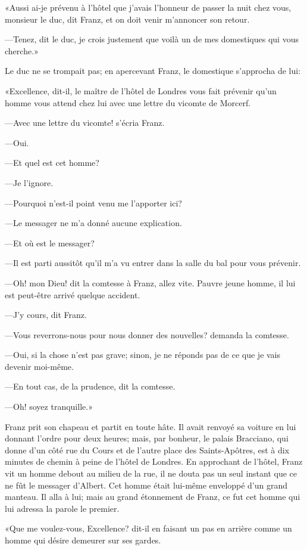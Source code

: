 «Aussi ai-je prévenu à l'hôtel que j'avais l'honneur de passer la nuit chez vous, monsieur le duc, dit Franz, et on doit venir m'annoncer son retour. 

—Tenez, dit le duc, je crois justement que voilà un de mes domestiques qui vous cherche.» 

Le duc ne se trompait pas; en apercevant Franz, le domestique s'approcha de lui: 

«Excellence, dit-il, le maître de l'hôtel de Londres vous fait prévenir qu'un homme vous attend chez lui avec une lettre du vicomte de Morcerf. 

—Avec une lettre du vicomte! s'écria Franz. 

—Oui. 

—Et quel est cet homme?  

—Je l'ignore. 

—Pourquoi n'est-il point venu me l'apporter ici? 

—Le messager ne m'a donné aucune explication. 

—Et où est le messager? 

—Il est parti aussitôt qu'il m'a vu entrer dans la salle du bal pour vous prévenir. 

—Oh! mon Dieu! dit la comtesse à Franz, allez vite. Pauvre jeune homme, il lui est peut-être arrivé quelque accident.  

—J'y cours, dit Franz. 

—Vous reverrons-nous pour nous donner des nouvelles? demanda la comtesse. 

—Oui, si la chose n'est pas grave; sinon, je ne réponds pas de ce que je vais devenir moi-même. 

—En tout cas, de la prudence, dit la comtesse. 

—Oh! soyez tranquille.» 

Franz prit son chapeau et partit en toute hâte. Il avait renvoyé sa voiture en lui donnant l'ordre pour deux heures; mais, par bonheur, le palais Bracciano, qui donne d'un côté rue du Cours et de l'autre place des Saints-Apôtres, est à dix minutes de chemin à peine de l'hôtel de Londres. En approchant de l'hôtel, Franz vit un homme debout au milieu de la rue, il ne douta pas un seul instant que ce ne fût le messager d'Albert. Cet homme était lui-même enveloppé d'un grand manteau. Il alla à lui; mais au grand étonnement de Franz, ce fut cet homme qui lui adressa la parole le premier. 

«Que me voulez-vous, Excellence? dit-il en faisant un pas en arrière comme un homme qui désire demeurer sur ses gardes. 

